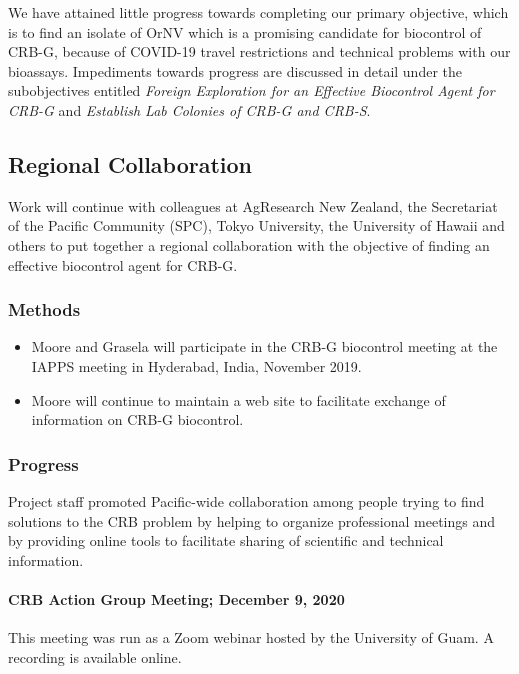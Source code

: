 \documentclass[12pt,letterpaper,english,bibliography=totocnumbered,abstract=on]{scrartcl}
\begin{document}
We have attained little progress towards completing our primary objective, which is to find an isolate of OrNV which is a promising candidate for biocontrol of CRB-G, because of COVID-19 travel restrictions and technical problems with our bioassays. Impediments towards progress are discussed in detail under the subobjectives entitled \textit{Foreign Exploration for an Effective Biocontrol Agent for CRB-G} and \textit{Establish Lab Colonies of CRB-G and CRB-S}.

\newpage
\begin{framed}
\subsection{Regional Collaboration}

Work will continue with colleagues at AgResearch New Zealand, the Secretariat of the Pacific Community (SPC), Tokyo University, the University of Hawaii and others to put together a regional collaboration with the objective of finding an effective biocontrol agent for CRB-G.

\subsubsection{Methods}

\begin{itemize}
    \item Moore and Grasela will participate in the CRB-G biocontrol meeting at the IAPPS meeting in Hyderabad, India, November 2019.
    \item Moore will continue to maintain a web site to facilitate exchange of information on CRB-G biocontrol.
\end{itemize}
\end{framed}

\subsubsection{Progress}

Project staff promoted Pacific-wide collaboration among people trying to find solutions to the CRB problem by helping to organize professional meetings and by providing online tools to facilitate sharing of scientific and technical information.

\paragraph{CRB Action Group Meeting; December 9, 2020}
This meeting was run as a Zoom webinar hosted by the University of Guam. A recording is available online.\cite{mooreVideoRecordingCRBG2021}
\end{document}
